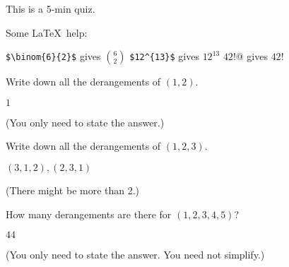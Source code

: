 

\renewcommand\AUTHOR{nweadick1@cougars.ccis.edu} %


\topmattertwo

This is a 5-min quiz.

Some \LaTeX\ help:
\begin{enumerate}[nosep]
\li \verb!$\binom{6}{2}$! gives $\binom{6}{2}$
\li \verb!$12^{13}$! gives $12^{13}$
\li \verb@$42!$@ gives $42!$
\end{enumerate}

\nextq
Write down all the derangements of $(1,2)$.
\\
\ANSWER
\begin{answerlong}
$1$
\end{answerlong}
(You only need to state the answer.)

\nextq
Write down all the derangements of $(1,2,3)$.
\\
\ANSWER
\begin{answerlong}
$(3,1,2), (2,3,1)$
\end{answerlong}
(There might be more than 2.)

\nextq
How many derangements are there for $(1,2,3,4,5)$?
\\
\ANSWER
\begin{answerlong}
$44$
\end{answerlong}
(You only need to state the answer. You need not simplify.)

\newpage


